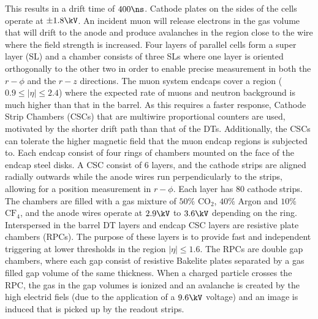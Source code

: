 This results in a drift time of $400\ns$. Cathode plates on the sides of the cells operate at $\pm1.8\kV$. 
An incident muon will release electrons in the gas volume that will drift to the anode and produce avalanches in the region close to the wire where the field strength is increased.
Four layers of parallel cells form a super layer (SL) and a chamber consists of three SLs where one layer is oriented orthogonally to the other two in order to enable precise measurement in both the $r-\phi$ and the $r-z$ directions.
\newpara
\noindent\justify
The muon system endcaps cover a region ($0.9\leq|\eta|\leq2.4$) where the expected rate of muons and neutron background is much higher than that in the barrel. 
As this requires a faster response, Cathode Strip Chambers (CSCs) that are multiwire proportional counters are used, motivated by the shorter drift path than that of the DTs. 
Additionally, the CSCs can tolerate the higher magnetic field that the muon endcap regions is subjected to. 
Each endcap consist of four rings of chambers mounted on the face of the endcap steel disks. 
A CSC consist of 6 layers, and the cathode strips are aligned radially outwards while the anode wires run perpendicularly to the strips, allowing for a position measurement in $r-\phi$. 
Each layer has 80 cathode strips. 
The chambers are filled with a gas mixture of $50\%$ $\mathrm{CO_{2}}$, $40\%$ Argon and $10\%$ $\mathrm{CF_{4}}$, and the anode wires operate at $2.9\kV$ to $3.6\kV$ depending on the ring. 
Interspersed in the barrel DT layers and endcap CSC layers are resistive plate chambers (RPCs). 
The purpose of these layers is to provide fast and independent triggering at lower \pt thresholds in the region $|\eta|\leq1.6$. 
The RPCs are double gap chambers, where each gap consist of resistive Bakelite plates separated by a gas filled gap volume of the same thickness. 
When a charged particle crosses the RPC, the gas in the gap volumes is ionized and an avalanche is created by the high electrid fiels (due to the application of a $9.6\kV$ voltage) and an image is induced that is picked up by the readout strips. 
